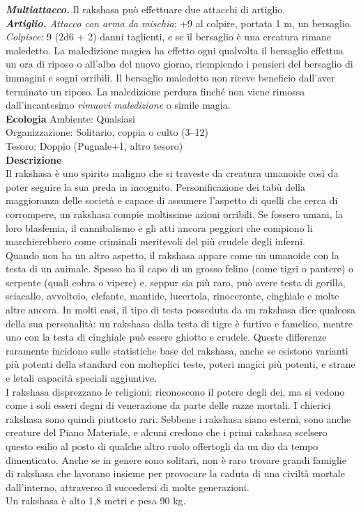 \begin{multicols}{2}
\emph{\textbf{Multiattacco.}} Il rakshasa può effettuare due attacchi di artiglio.\\
\emph{\textbf{Artiglio.} Attacco con arma da mischia}: +9 al colpire, portata 1 m, un bersaglio.\\
\emph{Colpisce:} 9 (2d6 + 2) danni taglienti, e se il bersaglio è una creatura rimane maledetto. La maledizione magica ha effetto ogni qualvolta il bersaglio effettua un ora di riposo o all'alba del nuovo giorno, riempiendo i pensieri del bersaglio di immagini e sogni orribili. Il bersaglio maledetto non riceve beneficio dall'aver terminato un riposo. La maledizione perdura finché non viene rimossa dall'incantesimo \emph{rimuovi maledizione} o simile magia.\\
\textbf{Ecologia}
Ambiente: Qualsiasi\\
Organizzazione: Solitario, coppia o culto (3–12)\\
Tesoro: Doppio (Pugnale+1, altro tesoro)\\
\textbf{Descrizione}\\
Il rakshasa è uno spirito maligno che si traveste da creatura umanoide così da poter seguire la sua preda in incognito. Personificazione dei tabù della maggioranza delle società e capace di assumere l’aspetto di quelli che cerca di corrompere, un rakshasa compie moltissime azioni orribili. Se fossero umani, la loro blasfemia, il cannibalismo e gli atti ancora peggiori che compiono li marchierebbero come criminali meritevoli del più crudele degli inferni.\\
Quando non ha un altro aspetto, il rakshasa appare come un umanoide con la testa di un animale. Spesso ha il capo di un grosso felino (come tigri o pantere) o serpente (quali cobra o vipere) e, seppur sia più raro, può avere testa di gorilla, sciacallo, avvoltoio, elefante, mantide, lucertola, rinoceronte, cinghiale e molte altre ancora. In molti casi, il tipo di testa posseduta da un rakshasa dice qualcosa della sua personalità: un rakshasa dalla testa di tigre è furtivo e famelico, mentre uno con la testa di cinghiale può essere ghiotto e crudele. Queste differenze raramente incidono sulle statistiche base del rakshasa, anche se esistono varianti più potenti della standard con molteplici teste, poteri magici più potenti, e strane e letali capacità speciali aggiuntive.\\
I rakshasa disprezzano le religioni; riconoscono il potere degli dei, ma si vedono come i soli esseri degni di venerazione da parte delle razze mortali. I chierici rakshasa sono quindi piuttosto rari. Sebbene i rakshasa siano esterni, sono anche creature del Piano Materiale, e alcuni credono che i primi rakshasa scelsero questo esilio al posto di qualche altro ruolo offertogli da un dio da tempo dimenticato. Anche se in genere sono solitari, non è raro trovare grandi famiglie di rakshasa che lavorano insieme per provocare la caduta di una civiltà mortale dall'interno, attraverso il succedersi di molte generazioni.\\
Un rakshasa è alto 1,8 metri e pesa 90 kg.\\


\end{multicols}
